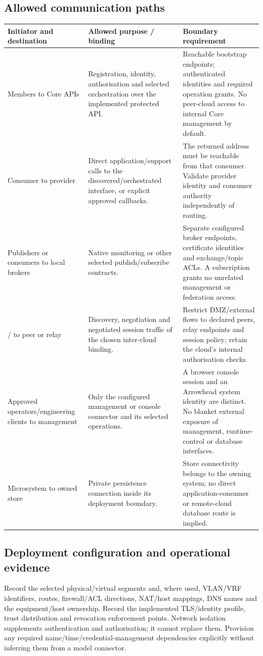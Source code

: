 \subsection{Allowed communication paths}
\begin{longtable}{|P{3.1cm}|P{4.2cm}|P{6.3cm}|}\hline
{} Initiator and destination & Allowed purpose / binding & Boundary requirement \\\hline\endhead
Members to Core APIs & Registration, identity, authorisation and selected orchestration over the implemented protected API. & Reachable bootstrap endpoints; authenticated identities and required operation grants. No peer-cloud access to internal Core management by default. \\\hline
Consumer to provider & Direct application/support calls to the discovered/orchestrated interface, or explicit approved callbacks. & The returned address must be reachable from that consumer. Validate provider identity and consumer authority independently of routing. \\\hline
Publishers or consumers to local brokers & Native monitoring or other selected publish/subscribe contracts. & Separate configured broker endpoints, certificate identities and exchange/topic ACLs. A subscription grants no unrelated management or federation access. \\\hline
{} /  to peer or relay & Discovery, negotiation and negotiated session traffic of the chosen inter-cloud binding. & Restrict DMZ/external flows to declared peers, relay endpoints and session policy; retain the cloud's internal authorisation checks. \\\hline
Approved operators/engineering clients to management & Only the configured management or console connector and its selected operations. & A browser console session and an Arrowhead system identity are distinct. No blanket external exposure of management, runtime-control or database interfaces. \\\hline
Microsystem to owned store & Private persistence connection inside its deployment boundary. & Store connectivity belongs to the owning system; no direct application-consumer or remote-cloud database route is implied. \\\hline
\end{longtable}

\subsection{Deployment configuration and operational evidence}
Record the selected physical/virtual segments and, where used, VLAN/VRF identifiers, routes, firewall/ACL directions, NAT/host mappings, DNS names and the equipment/host ownership. Record the implemented TLS/identity profile, trust distribution and revocation enforcement points. Network isolation supplements authentication and authorisation; it cannot replace them. Provision any required name/time/credential-management dependencies explicitly without inferring them from a model connector.


